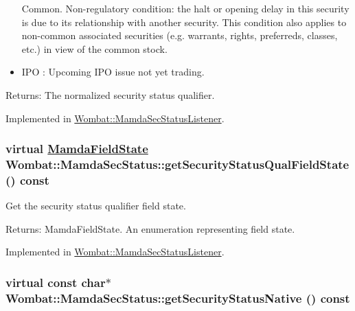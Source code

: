 \begin{itemize}
Common. Non-regulatory condition: the halt or opening delay in this security is due to its relationship with another security. This condition also applies to non-common associated securities (e.g. warrants, rights, preferreds, classes, etc.) in view of the common stock. \item IPO : Upcoming IPO issue not yet trading. \end{itemize}


\begin{Desc}
\item[Returns:]The normalized security status qualifier. \end{Desc}


Implemented in \hyperlink{classWombat_1_1MamdaSecStatusListener_c94de1b4d8e9377a219ce488fa7ef16c}{Wombat::Mamda\-Sec\-Status\-Listener}.\hypertarget{classWombat_1_1MamdaSecStatus_2552980479d78154cf754c3bcf4647c3}{
\subsubsection[getSecurityStatusQualFieldState]{\setlength{\rightskip}{0pt plus 5cm}virtual \hyperlink{namespaceWombat_93aac974f2ab713554fd12a1fa3b7d2a}{Mamda\-Field\-State} Wombat::Mamda\-Sec\-Status::get\-Security\-Status\-Qual\-Field\-State () const}}
\label{classWombat_1_1MamdaSecStatus_2552980479d78154cf754c3bcf4647c3}


Get the security status qualifier field state. 

\begin{Desc}
\item[Returns:]Mamda\-Field\-State. An enumeration representing field state. \end{Desc}


Implemented in \hyperlink{classWombat_1_1MamdaSecStatusListener_96338fb8e8ae1b6ab9d8ca695f711925}{Wombat::Mamda\-Sec\-Status\-Listener}.\hypertarget{classWombat_1_1MamdaSecStatus_db270a035cf0896af0326704b5799689}{
\subsubsection[getSecurityStatusNative]{\setlength{\rightskip}{0pt plus 5cm}virtual const char$\ast$ Wombat::Mamda\-Sec\-Status::get\-Security\-Status\-Native () const}}
\label{classWombat_1_1MamdaSecStatus_db270a035cf0896af0326704b5799689}


